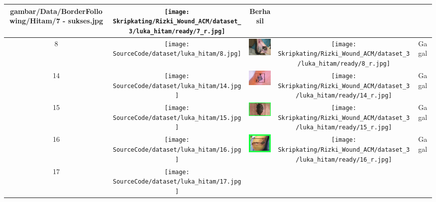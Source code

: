 \begin{longtable}[width = 8cm]{| c | c | c | c | c |}
        {gambar/Data/BorderFollowing/Hitam/7 - sukses.jpg} &
        \texttt{[image: Skripkating/Rizki\_Wound\_ACM/dataset\_3/luka\_hitam/ready/7\_r.jpg]} &
        Berhasil
        \\
        \hline
        8 &
        \texttt{[image: SourceCode/dataset/luka\_hitam/8.jpg]} &
        \includegraphics[keepaspectratio, width=2cm]
        {gambar/Data/BorderFollowing/Hitam/8 - failed.jpg} &
        \texttt{[image: Skripkating/Rizki\_Wound\_ACM/dataset\_3/luka\_hitam/ready/8\_r.jpg]} &
        Gagal
        \\
        \hline
        14 &
        \texttt{[image: SourceCode/dataset/luka\_hitam/14.jpg]} &
        \includegraphics[keepaspectratio, width=2cm]
        {gambar/Data/BorderFollowing/Hitam/14 - failed.jpg} &
        \texttt{[image: Skripkating/Rizki\_Wound\_ACM/dataset\_3/luka\_hitam/ready/14\_r.jpg]} &
        Gagal
        \\
        \hline
        15 &
        \texttt{[image: SourceCode/dataset/luka\_hitam/15.jpg]} &
        \includegraphics[keepaspectratio, width=2cm]
        {gambar/Data/BorderFollowing/Hitam/15 - failed.jpg} &
        \texttt{[image: Skripkating/Rizki\_Wound\_ACM/dataset\_3/luka\_hitam/ready/15\_r.jpg]} &
        Gagal
        \\
        \hline
        16 &
        \texttt{[image: SourceCode/dataset/luka\_hitam/16.jpg]} &
        \includegraphics[keepaspectratio, width=2cm]
        {gambar/Data/BorderFollowing/Hitam/16 - failed.jpg} &
        \texttt{[image: Skripkating/Rizki\_Wound\_ACM/dataset\_3/luka\_hitam/ready/16\_r.jpg]} &
        Gagal
        \\
        \hline
        17 &
        \texttt{[image: SourceCode/dataset/luka\_hitam/17.jpg]} &

\end{longtable}
